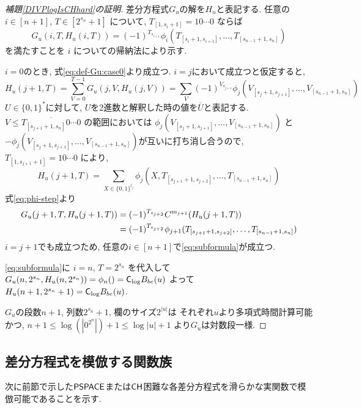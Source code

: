 \begin{proof}[\textup{補題\ref{DIVPlogIsCHhard}の証明}]
 差分方程式$G_u$の解を$H_u$と表記する.
 任意の $i \in [n+1]$, $T \in [2^{s_n}+1]$ について,
 $T_{[1, s_i +1]} = 10 \cdots 0$ ならば
 \begin{equation} \label{eq:subformula}
  G_u(i,T,H_u(i,T)) = (-1)^{T_{s_{i+1}}} 
   \phi_i(T_{[s_i+1, s_{i+1}]}, \dots, T_{[s_{n-1}+1, s_n]})
 \end{equation}
 を満たすことを $i$ についての帰納法により示す.

 $i=0$のとき, 式\eqref{eq:def-Gu:case0}より成立つ.
 $i=j$において成立つと仮定すると, 
\begin{equation}
  H_u(j+1, T) 
  = \sum_{V = 0}^{T-1} G_u(j, V, H_u(j, V)) 
  = \sum_{V} (-1)^{V_{s_{j+1}}} \phi_j(V_{[s_j+1, s_{j+1}]}, 
   \dots, V_{[s_{n-1}+1, s_n]})
\end{equation}
 $U \in \{0,1\}^*$に対して, $U$を2進数と解釈した時の値を$\overline U$と表記する.
 $V \le \overline{T_{[s_{j+1}+1, s_n]} 0 \cdots 0}$ の範囲においては
 $\phi_j(V_{[s_j+1, s_{j+1}]}, \dots, V_{[s_{n-1}+1, s_n]})$ と
 $- \phi_j(V_{[s_j+1, s_{j+1}]}, \dots, V_{[s_{n-1}+1, s_n]})$が互いに打ち消し合うので, $T_{[1,s_{j+1} +1]} = 10 \cdots 0$ により,
 \begin{equation}
  H_u(j+1, T) = \sum_{X \in \{0,1\}^{l_j}}
  \phi_j(X, T_{[s_{j+1}+1, s_{j+2}]}, \dots, T_{[s_{n-1}+1, s_n]})
 \end{equation}
 式\eqref{eq:phi-step}より
 \begin{align}
  G_u(j+1,T,H_u(j+1,T)) 
  &= (-1)^{T_{s_{j+2}}} C^{m_{j+1}} (H_u(j+1, T))
\notag
\\
  &= (-1)^{T_{s_{j+2}}} \phi_{j+1}(T_{[s_{j+1}+1, s_{j+2}]}, \dots, T_{[s_{n-1}+1, s_n]})
 \end{align}
 $i=j+1$でも成立つため, 任意の$i \in [n+1]$で\eqref{eq:subformula}が成立つ.


 \eqref{eq:subformula}に $i=n$, $T=2^{s_n}$ を代入して 
 $G_u(n, 2^{s_n}, H_u(n,2^{s_n})) = \phi_n() = \mathsf{C}_{\log} B_{be}(u)$
 よって $H_u(n+1, 2^{s_n}+1) = \mathsf{C}_{\log} B_{be}(u)$.
 
 $G_u$の段数$n+1$, 列数$2^{s_n}+1$, 欄のサイズ$2^{|u|}$は
 それぞれ$u$より多項式時間計算可能かつ,
 $n+1 \le \log(|0^{2^n}|) + 1 \le \log|u| + 1$
 より$G_u$は対数段一様.
 \end{proof}



\subsection{差分方程式を模倣する関数族}
\label{subsection: ode family}
次に前節で示した$\mathsf{PSPACE}$または$\mathsf{CH}$困難な各差分方程式を滑らかな実関数で模倣可能であることを示す.

